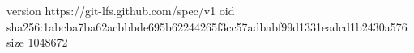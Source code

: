 version https://git-lfs.github.com/spec/v1
oid sha256:1abcba7ba62acbbbde695b62244265f3cc57adbabf99d1331eadcd1b2430a576
size 1048672
